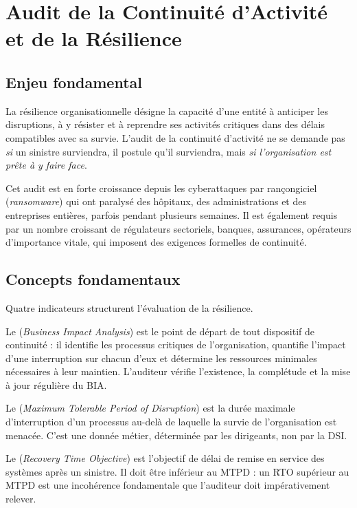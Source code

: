 \section{Audit de la Continuité d'Activité et de la Résilience}

\subsection{Enjeu fondamental}

La résilience organisationnelle désigne la capacité d'une entité à anticiper les disruptions, à y résister et à reprendre ses activités critiques dans des délais compatibles avec sa survie. L'audit de la continuité d'activité ne se demande pas \textit{si} un sinistre surviendra, il postule qu'il surviendra, mais \textit{si l'organisation est prête à y faire face}.

Cet audit est en forte croissance depuis les cyberattaques par rançongiciel (\textit{ransomware}) qui ont paralysé des hôpitaux, des administrations et des entreprises entières, parfois pendant plusieurs semaines. Il est également requis par un nombre croissant de régulateurs sectoriels, banques, assurances, opérateurs d'importance vitale, qui imposent des exigences formelles de continuité.

\subsection{Concepts fondamentaux}

Quatre indicateurs structurent l'évaluation de la résilience.

Le  (\textit{Business Impact Analysis}) est le point de départ de tout dispositif de continuité : il identifie les processus critiques de l'organisation, quantifie l'impact d'une interruption sur chacun d'eux et détermine les ressources minimales nécessaires à leur maintien. L'auditeur vérifie l'existence, la complétude et la mise à jour régulière du BIA.

Le  (\textit{Maximum Tolerable Period of Disruption}) est la durée maximale d'interruption d'un processus au-delà de laquelle la survie de l'organisation est menacée. C'est une donnée métier, déterminée par les dirigeants, non par la DSI.

Le  (\textit{Recovery Time Objective}) est l'objectif de délai de remise en service des systèmes après un sinistre. Il doit être inférieur au MTPD : un RTO supérieur au MTPD est une incohérence fondamentale que l'auditeur doit impérativement relever.

